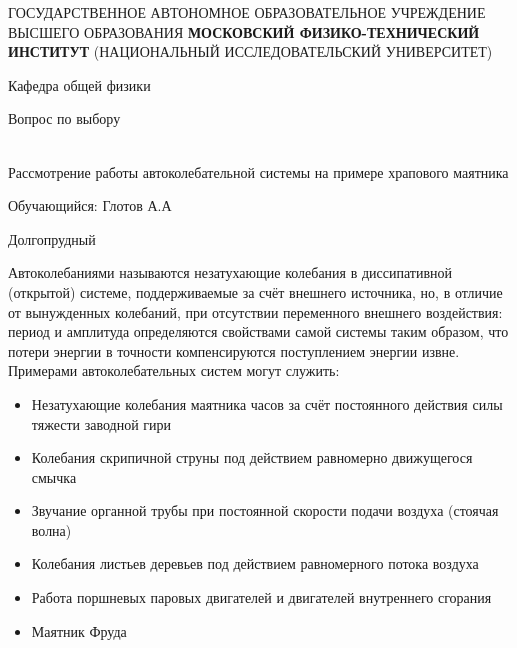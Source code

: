 \documentclass[12pt,a4paper]{article}
\author{Глотов Алексей}
\begin{document}
\newpage
\begin{center}
\footnotesize{{ГОСУДАРСТВЕННОЕ АВТОНОМНОЕ ОБРАЗОВАТЕЛЬНОЕ УЧРЕЖДЕНИЕ}\break
{ВЫСШЕГО ОБРАЗОВАНИЯ}
\break
{\bf {МОСКОВСКИЙ ФИЗИКО-ТЕХНИЧЕСКИЙ ИНСТИТУТ}}
\break
\small{(НАЦИОНАЛЬНЫЙ ИССЛЕДОВАТЕЛЬСКИЙ УНИВЕРСИТЕТ)}}
\break
\hfill \break
\hfill \break
\begin{center}
\normalsize{Кафедра общей физики}
\end{center}
\hfill \break
\hfill \break
\hfill \break
\hfill \break

\begin{center}
\normalsize {Вопрос по выбору}
\end{center}
\hfill \break\\
\large{Рассмотрение работы автоколебательной системы на примере храпового маятника}
\end{center}
\hfill \break
\hfill \break
\hfill \break
\hfill \break
\hfill \break
\hfill \break
\hfill \break
\hfill \break
\hfill \break
\hfill \break
\begin{flushright}
Обучающийся: Глотов А.А
\end{flushright}
\hfill \break
\hfill \break
\hfill \break
\hfill \break
\hfill \break
\hfill \break
\hfill \break
\hfill \break
\hfill \break
\hfill \break
\hfill \break
\hfill \break
\hfill \break
\begin{center}
Долгопрудный 
\end{center}
\thispagestyle{empty}
\newpage
\par Автоколебаниями называются незатухающие колебания в диссипативной (открытой) системе, поддерживаемые за счёт внешнего источника, но, в отличие от вынужденных колебаний, при отсутствии переменного внешнего воздействия: период и амплитуда определяются свойствами самой системы таким образом, что потери энергии в точности компенсируются поступлением энергии извне. Примерами автоколебательных систем могут служить:
\begin{itemize}
\item Незатухающие колебания маятника часов за счёт постоянного действия силы тяжести заводной гири
\item Колебания скрипичной струны под действием равномерно движущегося смычка
\item Звучание органной трубы при постоянной скорости подачи воздуха (стоячая волна)
\item  Колебания листьев деревьев под действием равномерного потока воздуха
\item Работа поршневых паровых двигателей и двигателей внутреннего сгорания
\item Маятник Фруда
\end{itemize}
\end{document}
